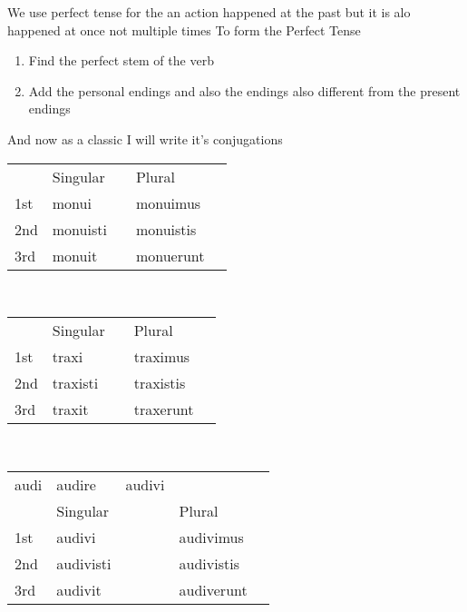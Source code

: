 We use perfect tense for the an action happened at the past but it 
is alo happened at once not multiple times  \newpage
To form the Perfect Tense
\begin{enumerate}
  \item Find the perfect stem of the verb
  \item Add the personal endings and also the endings also 
    different from the present endings 
\end{enumerate}
And now as a classic I will write it's conjugations 

\begin{center}  
  \begin{tabular}{lllll}
      & Singular  &   & Plural & \\
      1st & monui  &  & monuimus &  \\
      2nd & monuisti &  & monuistis &  \\
      3rd & monuit &  & monuerunt  &  \\
  \end{tabular}
\end{center} \\

\begin{center}  
  \begin{tabular}{lllll}
      & Singular  &   & Plural & \\
      1st & traxi  &  & traximus &  \\
      2nd & traxisti &  & traxistis &  \\
      3rd & traxit &  & traxerunt  &  \\
  \end{tabular}
\end{center} \\


\begin{center}  
  \begin{tabular}{lllll}
      audi & audire & audivi & & \\
      & Singular  &   & Plural & \\
      1st & audivi  &  & audivimus &  \\
      2nd & audivisti &  & audivistis &  \\
      3rd & audivit &  & audiverunt  &  \\
  \end{tabular}
\end{center}


